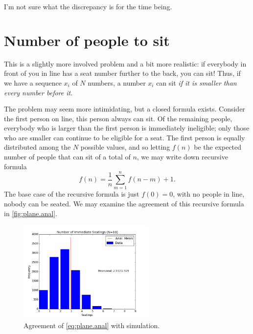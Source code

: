 \documentclass[12pt]{report}
\begin{document}
I'm not sure what the discrepancy is for the time being.

\section{Number of people to sit}

This is a slightly more involved problem and a bit more realistic: if everybody
in front of you in line has a seat number further to the back, you can sit!
Thus, if we have a sequence $x_i$ of $N$ numbers, a number $x_i$ can sit
\emph{if it is smaller than every number before it}.

The problem may seem more intimidating, but a closed formula exists. Consider
the first person on line, this person always can sit. Of the remaining people,
everybody who is larger than the first person is immediately ineligible; only
those who are smaller can continue to be eligible for a seat. The first person
is equally distributed among the $N$ possible values, and so letting $f(n)$ be
the expected number of people that can sit of a total of $n$, we may write down
recursive formula
\begin{equation}
    f(n) = \frac{1}{n}\sum\limits_{m = 1}^n f(n - m) + 1.\label{eq:plane.anal}
\end{equation}
The base case of the recursive formula is just $f(0) = 0$, with no people in
line, nobody can be seated. We may examine the agreement of this recursive
formula in \autoref{fig:plane.anal}.
\begin{figure}[t]
    \centering
    \includegraphics[width=0.6\textwidth]{plane_boarding//seatings.png}
    \caption{Agreement of \autoref{eq:plane.anal} with simulation.
    }\label{fig:plane.anal}
\end{figure}
\end{document}

